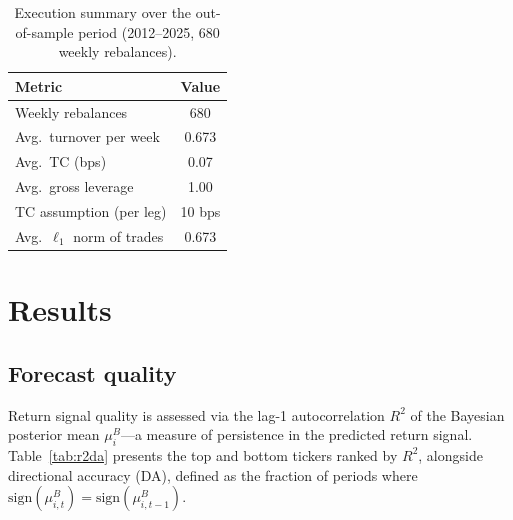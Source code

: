 \documentclass[10pt,twocolumn]{article}
\newcommand{\sign}{\mathrm{sign}}
\begin{document}
\begin{table}[!htbp]
\centering
\caption{Execution summary over the out-of-sample period
  (2012--2025, 680 weekly rebalances).}
\label{tab:execution}
\small
\begin{tabular}{@{}lc@{}}
\toprule
\textbf{Metric} & \textbf{Value} \\
\midrule
Weekly rebalances          & 680 \\
Avg.\ turnover per week    & 0.673 \\
Avg.\ TC (bps)             & 0.07 \\
Avg.\ gross leverage       & 1.00 \\
TC assumption (per leg)    & 10 bps \\
Avg.\ $\ell_1$ norm of trades & 0.673 \\
\bottomrule
\end{tabular}
\end{table}

\FloatBarrier
\section{Results}\label{sec:results}

\subsection{Forecast quality}

Return signal quality is assessed via the lag-1 autocorrelation
$R^2$ of the Bayesian posterior mean $\mu^B_i$---a measure of
persistence in the predicted return signal.  Table~\ref{tab:r2da}
presents the top and bottom tickers ranked by $R^2$, alongside
directional accuracy (DA), defined as the fraction of periods
where $\sign(\mu^B_{i,t})=\sign(\mu^B_{i,t-1})$.
\end{document}
